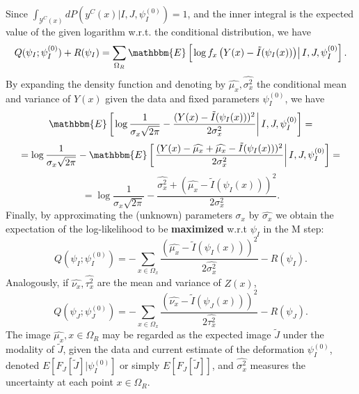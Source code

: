 Since \hbox{$\int_{\mathcal{Y}^{C}(x)}dP(y^{C}(x) | I, J, \psi^{(0)}_{I}) = 1$}, and the inner integral
is the expected value of the given logarithm w.r.t. the conditional distribution, we have
\begin{equation}
     Q(\psi_{I}; \psi_{I}^{(0)}) + R(\psi_{I}) = \sum_{\Omega_{R}} \mathbbm{E} \left[\left.\log f_{x}\left(Y(x) - \tilde{I}(\psi_{I}(x))\right) \right| I, J, \psi^{(0)}_{I}\right].
\end{equation}
By expanding the density function and denoting by $\widehat{\mu_{x}}, \widehat{\sigma_{x}^{2}}$ the conditional mean and variance of $Y(x)$ given the data and fixed
parameters $\psi_{I}^{(0)}$, we have
\begin{equation}
    \mathbbm{E} \left[\left.\log \frac{1}{\sigma_{x}\sqrt{2\pi}} - \frac{(Y(x) - \tilde{I}(\psi_{I}(x)))^{2}}{2\sigma_{x}^{2}}\right|I, J, \psi^{(0)}_{I} \right] =
\end{equation}
\begin{equation}
    = \log \frac{1}{\sigma_{x}\sqrt{2\pi}} - \mathbbm{E} \left[\left. \frac{(Y(x) - \widehat{\mu_{x}} + \widehat{\mu_{x}} - \tilde{I}(\psi_{I}(x)))^{2}}{2\sigma_{x}^{2}}\right|I, J, \psi^{(0)}_{I} \right]=
\end{equation}
\begin{equation}
    = \log \frac{1}{\sigma_{x}\sqrt{2\pi}} - \frac{\widehat{\sigma_{x}^{2}} + (\widehat{\mu_{x}} - \tilde{I}(\psi_{I}(x)))^{2}}{2\sigma_{x}^{2}}.
\end{equation}
Finally, by approximating the (unknown) parameters $\sigma_{x}$ by $\widehat{\sigma_{x}}$ we obtain the expectation of the log-likelihood to be \textbf{maximized} w.r.t $\psi_{I}$ in the M step:
\begin{equation}
    Q(\psi_{I}; \psi_{I}^{(0)}) =  - \sum_{x\in\Omega_{x}}\frac{(\widehat{\mu_{x}} - \tilde{I}(\psi_{I}(x)))^{2}}{2\widehat{\sigma_{x}^{2}}} - R(\psi_{I}).
\end{equation}
Analogously, if $\widehat{\nu_{x}}, \widehat{\tau_{x}^{2}}$ are the mean and variance of $Z(x)$,
\begin{equation}
    Q(\psi_{J}; \psi_{J}^{(0)}) =  - \sum_{x\in\Omega_{x}}\frac{(\widehat{\nu_{x}} - \tilde{I}(\psi_{J}(x)))^{2}}{2\widehat{\tau_{x}^{2}}} - R(\psi_{J}).
\end{equation}
The image $\widehat{\mu_{x}}, x\in\Omega_{R}$ may be regarded as the expected image $\tilde{J}$ under the modality of $\tilde{J}$, given the data and current estimate of the
deformation $\psi_{I}^{(0)}$, denoted $E[F_{J}[\tilde{J}]|\psi_{I}^{(0)}]$ or simply $E[F_{J}[\tilde{J}]]$, and $\widehat{\sigma_{x}^{2}}$ measures the uncertainty at each point
$x\in \Omega_{R}$.


